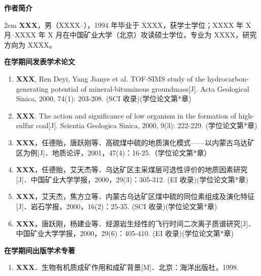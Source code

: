 \clearpage
{}
{}
\begingroup
    \centering
    \heiti\bfseries 作者简介
    \par
    \vspace{\baselineskip}
\endgroup

\begingroup
    \songti
    \setlength{\baselineskip}{\bodylineskip}
    \parindent 2em
    \textbf{XXX}，男（XXXX--），1994 年毕业于 XXXX，获学士学位；XXXX 年 X 月--XXXX 年 X 月在中国矿业大学（北京）攻读硕士学位，专业为 XXXX，研究方向为 XXXX。
\endgroup

\vspace{2\baselineskip}
\begingroup
    \centering
    \heiti\bfseries 在学期间发表学术论文
    \par
    \vspace{\baselineskip}
\endgroup

\begin{enumerate}[label=\arabic*., leftmargin=2em, itemsep=0pt, parsep=0pt]
    \songti
    \item \textbf{XXX}, Ren Deyi, Yang Jianye et al. TOF-SIMS study of the hydrocarbon-generating potential of mineral-bituminous groundmass[J]. Acta Geological Sinica, 2000, 74(1): 203-208. (SCI 收录)(学位论文第*章)
    \item \textbf{XXX}. The action and significance of low organism in the formation of high-sulfur coal[J]. Scientia Geologica Sinica, 2000, 9(3): 222-229. (学位论文第*章)
    \item \textbf{XXX}，任德贻，唐跃刚等．高硫煤中硫的地质演化模式——以内蒙古乌达矿区为例[J]．地质论评，2001，47(4)：16-25.（学位论文第*章）
    \item \textbf{XXX}，任德贻，艾天杰等．乌达矿区主采煤层可选性评价的地质因素研究[J]．中国矿业大学学报，2000，29(3)：305-312. (EI 收录)(学位论文第*章)
    \item \textbf{XXX}，艾天杰，焦方立等．内蒙古乌达矿区煤中硫的同位素组成及演化特征[J]．岩石学报，2000，16(2)：25-35. (SCI 收录)(学位论文第*章)
    \item \textbf{XXX}，唐跃刚，杨建业等．烃源岩生烃性的飞行时间二次离子质谱研究[J]．中国矿业大学学报，2000，29(6)：405-410. (EI 收录)(学位论文第*章)
\end{enumerate}

\vspace{1\baselineskip}
\begingroup
    \centering
    \heiti\bfseries 在学期间出版学术专著
    \par
    \vspace{\baselineskip}
\endgroup
\begin{enumerate}[label=\arabic*., leftmargin=2em, itemsep=0pt, parsep=0pt]
    \songti
    \item \textbf{XXX}．生物有机质成矿作用和成矿背景[M]．北京：海洋出版社，1998.
\end{enumerate}

